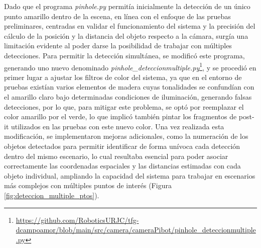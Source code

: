 Dado que el programa \textit{pinhole.py} permitía inicialmente la detección de un único punto amarillo dentro de la escena, en línea con el enfoque de las pruebas preliminares, centradas en validar el funcionamiento del sistema y la precisión del cálculo de la posición y la distancia del objeto respecto a la cámara, surgía una limitación evidente al poder darse la posibilidad de trabajar con múltiples detecciones. Para permitir la detección simultánea, se modificó este programa, generando uno nuevo denominado \textit{pinhole\_deteccionmultiple.py}\footnote{\url{https://github.com/RoboticsURJC/tfg-dcampoamor/blob/main/src/camera/cameraPibot/pinhole_deteccionmultiple.py}}, y se procedió en primer lugar a ajustar los filtros de color del sistema, ya que en el entorno de pruebas existían varios elementos de madera cuyas tonalidades se confundían con el amarillo claro bajo determinadas condiciones de iluminación, generando falsas detecciones, por lo que, para mitigar este problema, se optó por reemplazar el color amarillo por el verde, lo que implicó también pintar los fragmentos de post-it utilizados en las pruebas con este nuevo color. Una vez realizada esta modificación, se implementaron mejoras adicionales, como la numeración de los objetos detectados para permitir identificar de forma unívoca cada detección dentro del mismo escenario, lo cual resultaba esencial para poder asociar correctamente las coordenadas espaciales y las distancias estimadas con cada objeto individual, ampliando la capacidad del sistema para trabajar en escenarios más complejos con múltiples puntos de interés (Figura \ref{fig:deteccion_multiple_ptos}).

